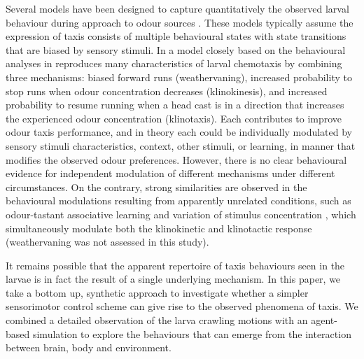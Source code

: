 \documentclass[10pt,a4paper]{article}
\begin{document}
Several models have been designed to capture quantitatively the observed larval behaviour during approach to odour sources  \citep{davies2015model,hernandez2015reverse,schleyer2015learning,gepner2015computations}. These models typically assume the expression of taxis consists of multiple behavioural states with state transitions that are biased by sensory stimuli. In \cite{davies2015model} a model closely based on the behavioural analyses in
 \citet{lahiri2011two,gomez2014multilevel,gomez2011active} reproduces many characteristics of larval chemotaxis by combining three mechanisms: biased forward runs (weathervaning), increased probability to stop runs when odour concentration decreases (klinokinesis), and increased probability to resume running when a head cast is in a direction that increases the experienced odour concentration (klinotaxis). Each contributes to improve odour taxis performance, and in theory each could be individually modulated by sensory stimuli characteristics, context, other stimuli, or learning, in manner that modifies the observed odour preferences. However, there is no clear behavioural evidence for independent modulation of different mechanisms under different circumstances. On the contrary, strong similarities are observed in the behavioural modulations resulting from apparently unrelated conditions, such as odour-tastant associative learning and variation of stimulus concentration \citep{schleyer2015learning}, which simultaneously modulate both the klinokinetic and klinotactic response (weathervaning was not assessed in this study).

It remains possible that the apparent repertoire of taxis behaviours seen in the larvae is in fact the result of a single underlying mechanism. In this paper, we take a bottom up, synthetic approach \citep{braitenberg1986vehicles} to investigate whether a simpler sensorimotor control scheme can give rise to the observed phenomena of taxis. We combined a detailed observation of the larva crawling motions with an agent-based simulation to explore the behaviours that can emerge from the interaction between brain, body and environment.
\end{document}
